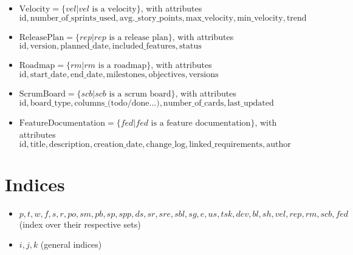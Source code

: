 \documentclass[11pt]{article}
\begin{document}
\begin{itemize}
    \item $\text{Velocity} = \{vel | vel \text{ is a velocity}\}$, with attributes $\text{id}, \text{number\_of\_sprints\_used}, \text{avg.\_story\_points}, \text{max\_velocity}, \text{min\_velocity}, \text{trend}$
    \item $\text{ReleasePlan} = \{rep | rep \text{ is a release plan}\}$, with attributes $\text{id}, \text{version}, \text{planned\_date}, \text{included\_features}, \text{status}$
    \item $\text{Roadmap} = \{rm | rm \text{ is a roadmap}\}$, with attributes $\text{id}, \text{start\_date}, \text{end\_date}, \text{milestones}, \text{objectives}, \text{versions}$
    \item $\text{ScrumBoard} = \{scb | scb \text{ is a scrum board}\}$, with attributes $\text{id}, \text{board\_type}, \text{columns\_(todo/done...)}, \text{number\_of\_cards}, \text{last\_updated}$
    \item $\text{FeatureDocumentation} = \{fed | fed \text{ is a feature documentation}\}$, with attributes $\text{id}, \text{title}, \text{description}, \text{creation\_date}, \text{change\_log}, \text{linked\_requirements}, \text{author}$
\end{itemize}

\section{Indices}
\begin{itemize}
    \item $p, t, w, f, s, r, po, sm, pb, sp, spp, ds, sr, sre, sbl, sg, e, us, tsk, dev, bl, sh, vel, rep, rm, scb, fed$ (index over their respective sets)
    \item $i, j, k$ (general indices)
\end{itemize}
\end{document}

